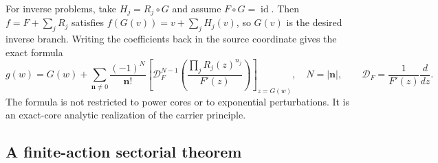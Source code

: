 \documentclass[11pt,a4paper]{article}
\theoremstyle{definition}
\theoremstyle{remark}
\newcommand{\id}{\operatorname{id}}
\newcommand{\DF}{\mathcal D_F}
\newcommand{\nn}{\boldsymbol n}
\numberwithin{equation}{section}
\begin{document}
For inverse problems, take $H_j=R_j\circ G$ and assume $F\circ G=\id$. Then $f=F+\sum_jR_j$ satisfies $f(G(v))=v+\sum_jH_j(v)$, so $G(v)$ is the desired inverse branch. Writing the coefficients back in the source coordinate gives the exact formula
\begin{equation}\label{eq:sourceoperator}
 g(w)=G(w)+\sum_{\nn\ne0}\frac{(-1)^N}{\nn!}
 \left[
 \DF^{N-1}\left(\frac{\prod_jR_j(z)^{n_j}}{F'(z)}\right)
 \right]_{z=G(w)},
 \quad N=|\nn|,
 \qquad \DF=\frac1{F'(z)}\frac{d}{dz}.
\end{equation}
The formula is not restricted to power cores or to exponential perturbations. It is an exact-core analytic realization of the carrier principle.

\subsection{A finite-action sectorial theorem}
\end{document}
